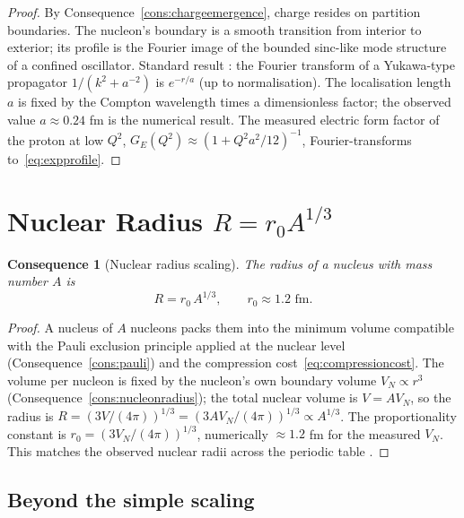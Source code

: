 \documentclass[11pt,twocolumn,a4paper]{article}
\theoremstyle{axiomstyle}
\theoremstyle{conseqstyle}
\newtheorem{consequence}{Consequence}
\theoremstyle{definition}
\theoremstyle{remark}
\begin{document}
\begin{proof}
By Consequence~\ref{cons:chargeemergence}, charge resides on partition boundaries. The nucleon's boundary is a smooth transition from interior to exterior; its profile is the Fourier image of the bounded sinc-like mode structure of a confined oscillator. Standard result \citep[Ch. 4]{arfkenweber2005}: the Fourier transform of a Yukawa-type propagator $1/(k^{2}+a^{-2})$ is $e^{-r/a}$ (up to normalisation). The localisation length $a$ is fixed by the Compton wavelength times a dimensionless factor; the observed value $a\approx 0.24$ fm \citep{hofstadtermcallister1955,hofstadter1956} is the numerical result. The measured electric form factor of the proton at low $Q^{2}$, $G_{E}(Q^{2})\approx (1+Q^{2}a^{2}/12)^{-1}$, Fourier-transforms to~\eqref{eq:expprofile}.
\end{proof}

\section{Nuclear Radius $R=r_{0}A^{1/3}$}
\label{sec:nuclearradius}

\begin{consequence}[Nuclear radius scaling]
\label{cons:nuclearradius}
The radius of a nucleus with mass number $A$ is
\begin{equation}
R=r_{0}\,A^{1/3},\qquad r_{0}\approx 1.2\text{ fm}.
\label{eq:Arootthree}
\end{equation}
\end{consequence}

\begin{proof}
A nucleus of $A$ nucleons packs them into the minimum volume compatible with the Pauli exclusion principle applied at the nuclear level (Consequence~\ref{cons:pauli}) and the compression cost~\eqref{eq:compressioncost}. The volume per nucleon is fixed by the nucleon's own boundary volume $V_{N}\propto r^{3}$ (Consequence~\ref{cons:nucleonradius}); the total nuclear volume is $V=A V_{N}$, so the radius is $R=(3V/(4\pi))^{1/3}=(3AV_{N}/(4\pi))^{1/3}\propto A^{1/3}$. The proportionality constant is $r_{0}=(3V_{N}/(4\pi))^{1/3}$, numerically $\approx 1.2$ fm for the measured $V_{N}$. This matches the observed nuclear radii across the periodic table \citep{hofstadter1956,krane1988}.
\end{proof}

\subsection{Beyond the simple scaling}
\end{document}
